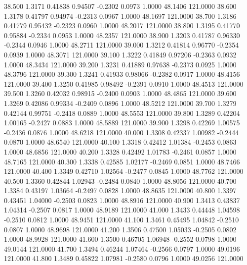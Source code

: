   38.500   1.3171   0.41838   0.94507  -0.2302   0.0973   1.0000  48.1406 121.0000
  38.600   1.3178   0.41797   0.94974  -0.2313   0.0967   1.0000  48.1697 121.0000
  38.700   1.3186   0.41779   0.95432  -0.2323   0.0960   1.0000  48.2017 121.0000
  38.800   1.3195   0.41770   0.95884  -0.2334   0.0953   1.0000  48.2357 121.0000
  38.900   1.3203   0.41787   0.96330  -0.2344   0.0946   1.0000  48.2711 121.0000
  39.000   1.3212   0.41814   0.96770  -0.2354   0.0939   1.0000  48.3071 121.0000
  39.100   1.3222   0.41849   0.97206  -0.2363   0.0932   1.0000  48.3434 121.0000
  39.200   1.3231   0.41889   0.97638  -0.2373   0.0925   1.0000  48.3796 121.0000
  39.300   1.3241   0.41933   0.98066  -0.2382   0.0917   1.0000  48.4156 121.0000
  39.400   1.3250   0.41985   0.98492  -0.2391   0.0910   1.0000  48.4513 121.0000
  39.500   1.3260   0.42032   0.98915  -0.2400   0.0903   1.0000  48.4865 121.0000
  39.600   1.3269   0.42086   0.99334  -0.2409   0.0896   1.0000  48.5212 121.0000
  39.700   1.3279   0.42144   0.99751  -0.2418   0.0889   1.0000  48.5553 121.0000
  39.800   1.3289   0.42204   1.00165  -0.2427   0.0883   1.0000  48.5889 121.0000
  39.900   1.3298   0.42269   1.00575  -0.2436   0.0876   1.0000  48.6218 121.0000
  40.000   1.3308   0.42337   1.00982  -0.2444   0.0870   1.0000  48.6540 121.0000
  40.100   1.3318   0.42412   1.01384  -0.2453   0.0863   1.0000  48.6856 121.0000
  40.200   1.3328   0.42492   1.01783  -0.2461   0.0857   1.0000  48.7165 121.0000
  40.300   1.3338   0.42585   1.02177  -0.2469   0.0851   1.0000  48.7466 121.0000
  40.400   1.3349   0.42710   1.02564  -0.2477   0.0845   1.0000  48.7762 121.0000
  40.500   1.3360   0.42844   1.02943  -0.2484   0.0840   1.0000  48.8056 121.0000
  40.700   1.3384   0.43197   1.03664  -0.2497   0.0828   1.0000  48.8635 121.0000
  40.800   1.3397   0.43451   1.04000  -0.2503   0.0823   1.0000  48.8916 121.0000
  40.900   1.3413   0.43837   1.04314  -0.2507   0.0817   1.0000  48.9189 121.0000
  41.000   1.3433   0.44448   1.04598  -0.2510   0.0812   1.0000  48.9451 121.0000
  41.100   1.3461   0.45495   1.04842  -0.2510   0.0807   1.0000  48.9698 121.0000
  41.200   1.3506   0.47500   1.05033  -0.2505   0.0802   1.0000  48.9928 121.0000
  41.600   1.3500   0.46705   1.06948  -0.2552   0.0798   1.0000  49.0144 121.0000
  41.700   1.3494   0.46244   1.07464  -0.2566   0.0797   1.0000  49.0196 121.0000
  41.800   1.3489   0.45822   1.07981  -0.2580   0.0796   1.0000  49.0256 121.0000

